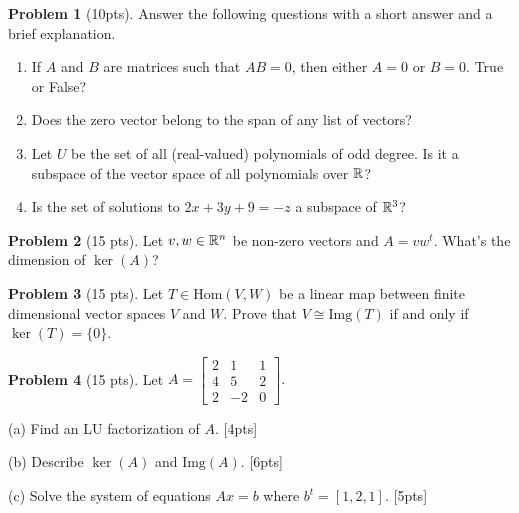 \documentclass[12pt]{amsart}
\theoremstyle{definition}
\newtheorem{prob}{Problem}
\begin{document}
\begin{prob}[10pts]Answer the following questions with a short answer and a brief explanation.
	\begin{enumerate}
		\item If $A$ and $B$ are matrices such that $AB=0$, then either $A=0$ or $B=0$. True or False? \vspace{5cm}
		
		\item Does the zero vector belong to the span of any list of vectors? \vspace{5cm}
		
		\item Let $U$ be the set of all (real-valued) polynomials of odd degree. Is it a subspace of the vector space of all polynomials over $\mathbb{R}$?\vspace{5cm}
		\item Is the set of solutions to $2x+3y+9=-z$ a subspace of $\mathbb{R}^3$?	\end{enumerate}
\end{prob}

\newpage

\begin{prob}[15 pts]
	Let $v,w\in\mathbb{R}^n$ be non-zero vectors and $A=vw^{t}$. What's the dimension of $\ker(A)$?
\end{prob}

\newpage

\begin{prob}[15 pts]
	Let $T\in\text{Hom}(V,W)$ be a linear map between finite dimensional vector spaces $V$ and $W$. Prove that $V\cong \text{Img}(T)$ if and only if $\ker(T)=\{0\}$.
\end{prob}
\newpage
\begin{prob}[15 pts]
	Let $A=\left[ \begin{array}{cccc} 2 & 1 & 1  \\ 4 & 5 & 2  \\ 2 & -2  & 0 \end{array} \right] .$
	
	(a) Find an LU factorization of $A$. [4pts]\vspace{11cm}
	
	(b) Describe $\ker(A)$ and $\text{Img}(A)$. [6pts] \vspace{12cm}
	
	(c) Solve the system of equations $Ax=b$ where $b^t=[1,2,1]$. [5pts]
	
	
\end{prob}
\end{document}
